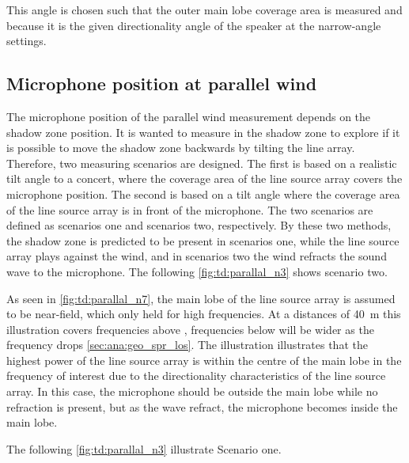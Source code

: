 
This angle is chosen such that the outer main lobe coverage area is measured and because it is the given directionality angle of the speaker at the narrow-angle settings.  


\subsection{Microphone position at parallel wind}\label{tops:mic_pos_par}
The microphone position of the parallel wind measurement depends on the shadow zone position. It is wanted to measure in the shadow zone to explore if it is possible to move the shadow zone backwards by tilting the line array. Therefore, two measuring scenarios are designed.  The first is based on a realistic tilt angle to a concert, where the coverage area of the line source array covers the microphone position. The second is based on a tilt angle where the coverage area of the line source array is in front of the microphone. The two scenarios are defined as scenarios one and scenarios two, respectively.  By these two methods, the shadow zone is predicted to be present in scenarios one, while the line source array plays against the wind, and in scenarios two the wind refracts the sound wave to the microphone. The following \autoref{fig:td:parallal_n3} shows scenario two.


As seen in \autoref{fig:td:parallal_n7}, the main lobe of the line source array is assumed to be near-field, which only held for high frequencies. At a distances of \SI{40}{\meter} this illustration covers frequencies above , frequencies below will be wider as the frequency drops \autoref{sec:ana:geo_spr_los}. The illustration illustrates that the highest power of the line source array is within the centre of the main lobe in the frequency of interest due to the directionality characteristics of the line source array. In this case, the microphone should be outside the main lobe while no refraction is present, but as the wave refract, the microphone becomes inside the main lobe. 

 The following \autoref{fig:td:parallal_n3} illustrate Scenario one.


